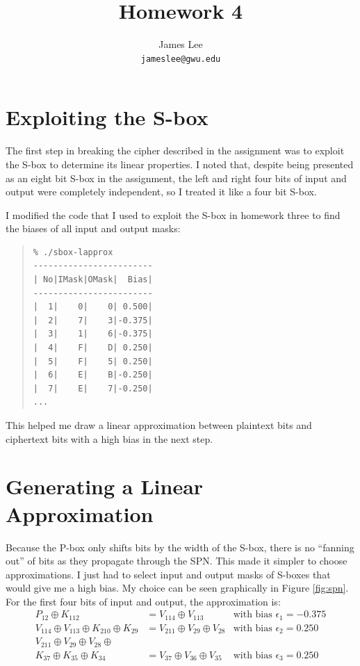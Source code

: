 \documentclass{amsart}
\title{Homework 4}
\author{James Lee\\
\texttt{jameslee@gwu.edu}}
\begin{document}
\maketitle

\section{Exploiting the S-box}
The first step in breaking the cipher described in the assignment was to exploit the S-box to determine its linear properties.  I noted that, despite being presented as an eight bit S-box in the assignment, the left and right four bits of input and output were completely independent, so I treated it like a four bit S-box.

I modified the code that I used to exploit the S-box in homework three to find the biases of all input and output masks:

\begin{quote}
\begin{verbatim}
% ./sbox-lapprox 
------------------------
| No|IMask|OMask|  Bias|
------------------------
|  1|    0|    0| 0.500|
|  2|    7|    3|-0.375|
|  3|    1|    6|-0.375|
|  4|    F|    D| 0.250|
|  5|    F|    5| 0.250|
|  6|    E|    B|-0.250|
|  7|    E|    7|-0.250|
...
\end{verbatim}
\end{quote}

This helped me draw a linear approximation between plaintext bits and ciphertext bits with a high bias in the next step.

\section{Generating a Linear Approximation}
Because the P-box only shifts bits by the width of the S-box, there is no ``fanning out'' of bits as they propagate through the SPN.  This made it simpler to choose approximations.  I just had to select input and output masks of S-boxes that would give me a high bias.  My choice can be seen graphically in Figure \ref{fig:spn}.  For the first four bits of input and output, the approximation is:
\begin{align*}
P_{12}\oplus K_{112} &= V_{114}\oplus V_{113}&\textrm{with bias } \epsilon_1=-0.375\\
V_{114}\oplus V_{113}\oplus K_{210}\oplus K_{29} &= V_{211}\oplus V_{29}\oplus V_{28}&\textrm{with bias } \epsilon_2=0.250\\
V_{211}\oplus V_{29}\oplus V_{28}\oplus &&\\
K_{37}\oplus K_{35}\oplus K_{34} &= V_{37}\oplus V_{36}\oplus V_{35}&\textrm{with bias } \epsilon_3=0.250\\
\end{align*}
\end{document}
